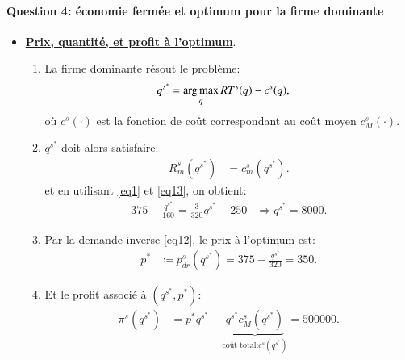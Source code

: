 \documentclass[notes, ignorenonframetext, compress, 9pt, xcolor=svgnames, aspectratio=169]{beamer}
\begin{document}
\begin{frame}
  [allowframebreaks]{\insertsection}
  \framesubtitle{Question 4: économie fermée et optimum pour la firme dominante}
  \begin{itemize}
  \item \underline{\textbf{Prix, quantité, et profit à l'optimum}}.
  \begin{enumerate}[$\cdot$]
  \item La firme dominante résout le problème:
  \begin{align*}
  q^{s^*} &=\argmax_q  RT^s(q) - c^s(q),
  \end{align*}
  où $c^s(\cdot)$ est la fonction de coût correspondant au coût moyen $c_M^s(\cdot)$. 
  \item $q^{s^*} $ doit alors satisfaire:
  \begin{align*}
   R^s_m(q^{s^*}) &= c_m^s(q^{s^*}).
  \end{align*}
  et en utilisant \eqref{eq1} et \eqref{eq13}, on obtient:
  \begin{align*}
  375-  \frac{q^{s^*}}{160} = \frac{3}{320}q^{s^*} + 250&\Rightarrow  q^{s^*} = 8000.
  \end{align*}
  \item Par la demande inverse \eqref{eq12}, le prix à l'optimum est:
  \begin{align*}
  p^*&\coloneqq  p_{dr}^s(q^{s^*})  = 375 - \frac{q^{s^*}}{320} = 350.
  \end{align*}
  \item Et le profit associé à $(q^{s^*}, p^*)$:
  \begin{align*}
  \pi^s(q^{s^*}) &= p^*q^{s^*} - \underbrace{q^{s^*} c_M^s(q^{s^*})}_{\text{coût total:} c^s(q^{s^*})} = 500000.
  \end{align*}
  \end{enumerate}
  \end{itemize}
  \end{frame}
  
\end{document}
